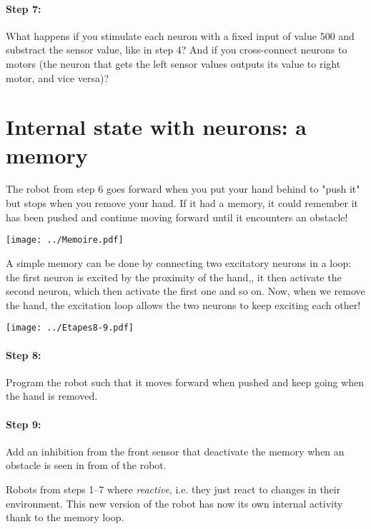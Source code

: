 \documentclass[12pt]{article}
\begin{document}
\paragraph{Step 7:} What happens if you stimulate each neuron with a fixed input of value 500 and substract the sensor value, like in step 4? And if you cross-connect neurons to motors (the neuron that gets the left sensor values outputs its value to right motor, and vice versa)?

\section{Internal state with neurons: a memory}

The robot from step 6 goes forward when you put your hand behind to "push it" but stops when you remove your hand. If it had a memory, it could remember it has been pushed and continue moving forward until it encounters an obstacle!

\begin{center}
\texttt{[image: ../Memoire.pdf]}
\end{center}


A simple memory can be done by connecting two excitatory neurons in a loop: the first neuron is excited by the proximity of the hand,, it then activate the second neuron, which then activate the first one and so on. Now, when we remove the hand, the excitation loop allows the two neurons to keep exciting each other!

\begin{center}
\texttt{[image: ../Etapes8-9.pdf]}
\end{center}

\paragraph{Step 8:} Program the robot such that it moves forward when pushed and keep going when the hand is removed.

\paragraph{Step 9:} Add an inhibition from the front sensor that deactivate the memory when an obstacle is seen in from of the robot.

Robots from steps 1--7 where \emph{reactive}, i.e. they just react to changes in their environment. This new version of the robot has now its own internal activity thank to the memory loop.
\end{document}
